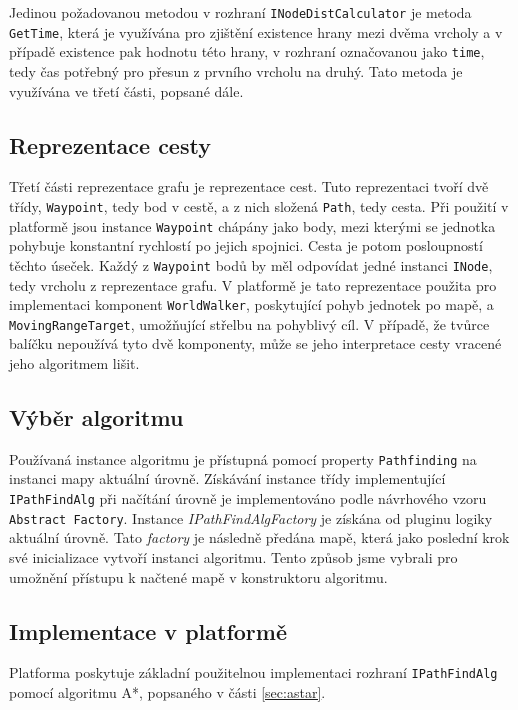 Jedinou požadovanou metodou v rozhraní \texttt{INodeDistCalculator} je metoda \texttt{GetTime}, která je využívána pro zjištění existence hrany mezi dvěma vrcholy a v případě existence pak hodnotu této hrany, v rozhraní označovanou jako \texttt{time}, tedy čas potřebný pro přesun z prvního vrcholu na druhý. Tato metoda je využívána ve třetí části, popsané dále.

\subsection{Reprezentace cesty}
\label{sec:path}
Třetí části reprezentace grafu je reprezentace cest. Tuto reprezentaci tvoří dvě třídy, \texttt{Waypoint}, tedy bod v cestě, a z nich složená \texttt{Path}, tedy cesta. Při použití v platformě jsou instance \texttt{Waypoint} chápány jako body, mezi kterými se jednotka pohybuje konstantní rychlostí po jejich spojnici. Cesta je potom posloupností těchto úseček. Každý z \texttt{Waypoint} bodů by měl odpovídat jedné instanci \texttt{INode}, tedy vrcholu z reprezentace grafu. V platformě je tato reprezentace použita pro implementaci komponent \texttt{WorldWalker}, poskytující pohyb jednotek po mapě, a \texttt{MovingRangeTarget}, umožňující střelbu na pohyblivý cíl. V případě, že tvůrce balíčku nepoužívá tyto dvě komponenty, může se jeho interpretace cesty vracené jeho algoritmem lišit.


\subsection{Výběr algoritmu}
Používaná instance algoritmu je přístupná pomocí property \texttt{Pathfinding} na instanci mapy aktuální úrovně. Získávání instance třídy implementující \texttt{IPathFindAlg} při načítání úrovně je implementováno podle návrhového vzoru \texttt{Abstract Factory}. Instance \textit{IPathFindAlgFactory} je získána od pluginu logiky aktuální úrovně. Tato \textit{factory} je následně předána mapě, která jako poslední krok své inicializace vytvoří instanci algoritmu. Tento způsob jsme vybrali pro umožnění přístupu k načtené mapě v konstruktoru algoritmu.

\subsection{Implementace v platformě}
Platforma poskytuje základní použitelnou implementaci rozhraní \texttt{IPathFindAlg} pomocí algoritmu A*, popsaného v části \ref{sec:astar}. 

